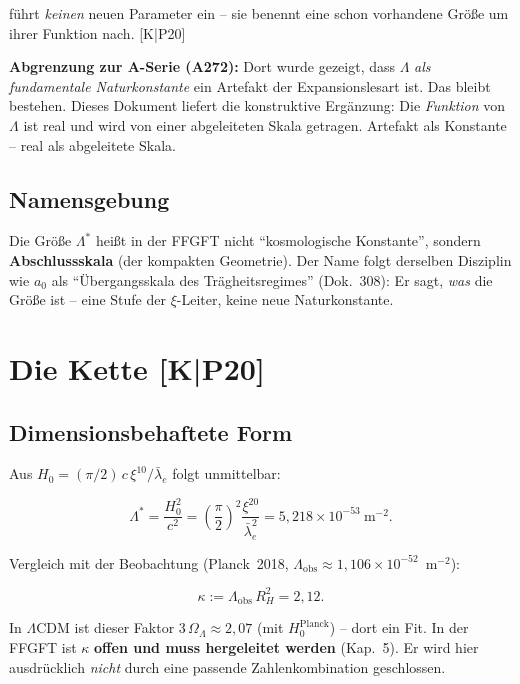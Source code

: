 \documentclass[11pt]{report}
\begin{document}
führt \emph{keinen} neuen Parameter ein -- sie benennt eine schon
vorhandene Größe um ihrer Funktion nach. [K|P20]

\textbf{Abgrenzung zur A-Serie (A272):} Dort wurde gezeigt, dass
$\Lambda$ \emph{als fundamentale Naturkonstante} ein Artefakt der
Expansionslesart ist. Das bleibt bestehen. Dieses Dokument liefert die
konstruktive Ergänzung: Die \emph{Funktion} von $\Lambda$ ist real und
wird von einer abgeleiteten Skala getragen. Artefakt als Konstante --
real als abgeleitete Skala.

\section{Namensgebung}

Die Größe $\Lambda^{*}$ heißt in der FFGFT nicht
\enquote{kosmologische Konstante}, sondern \textbf{Abschlussskala}
(der kompakten Geometrie). Der Name folgt derselben Disziplin wie
$a_0$ als \enquote{Übergangsskala des Trägheitsregimes} (Dok.~308):
Er sagt, \emph{was} die Größe ist -- eine Stufe der $\xi$-Leiter,
keine neue Naturkonstante.

\chapter{Die Kette [K|P20]}

\section{Dimensionsbehaftete Form}

Aus $H_0 = (\pi/2)\,c\,\xi^{10}/\bar\lambda_e$ folgt unmittelbar:

\begin{equation}
  \Lambda^{*}
  = \frac{H_0^2}{c^2}
  = \left(\frac{\pi}{2}\right)^{2}\frac{\xi^{20}}{\bar\lambda_e^{2}}
  = 5{,}218\times10^{-53}~\text{m}^{-2}.
  \label{eq:kette}
\end{equation}

Vergleich mit der Beobachtung (Planck~2018,
$\Lambda_\text{obs} \approx 1{,}106\times10^{-52}$~m$^{-2}$):

\begin{equation}
  \kappa := \Lambda_\text{obs}\,R_H^{2} = 2{,}12.
  \label{eq:kappa}
\end{equation}

In $\Lambda$CDM ist dieser Faktor $3\,\Omega_\Lambda \approx 2{,}07$
(mit $H_0^\text{Planck}$) -- dort ein Fit. In der FFGFT ist $\kappa$
\textbf{offen und muss hergeleitet werden} (Kap.~5). Er wird hier
ausdrücklich \emph{nicht} durch eine passende Zahlenkombination
geschlossen.
\end{document}

